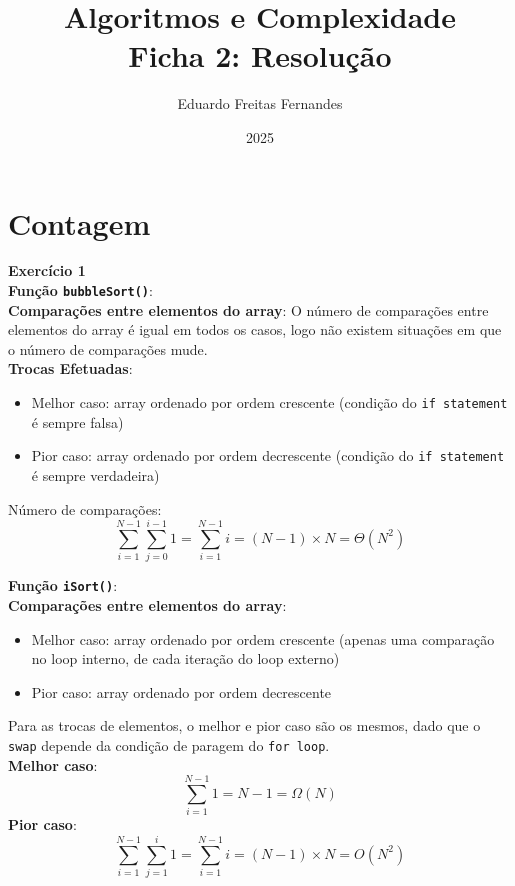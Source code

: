 \documentclass[a4paper,11pt]{article}
\title{Algoritmos e Complexidade\\ Ficha 2: Resolução}
\author{Eduardo Freitas Fernandes}
\date{2025}
\begin{document}
	
	\maketitle
	
	\section{Contagem}
	
	\textbf{Exercício 1}\\
	
	\noindent \textbf{Função \texttt{bubbleSort()}}:\\
	
	\noindent \textbf{Comparações entre elementos do array}:
	O número de comparações entre elementos do array é igual em todos os casos, logo não existem situações em que o número de comparações mude.\\
	
	\noindent \textbf{Trocas Efetuadas}:
	\begin{itemize}
		\item Melhor caso: array ordenado por ordem crescente (condição do \texttt{if statement} é sempre falsa)
		\item Pior caso: array ordenado por ordem decrescente (condição do \texttt{if statement} é sempre verdadeira)
	\end{itemize}
	
	\noindent Número de comparações:
	\[
	\sum_{i=1}^{N-1} \sum_{j=0}^{i-1} 1 = \sum_{i=1}^{N-1} i = (N-1) \times N = \Theta(N^2)
	\]
	
	\noindent \textbf{Função \texttt{iSort()}}:\\
	
	\noindent \textbf{Comparações entre elementos do array}:
	\begin{itemize}
		\item Melhor caso: array ordenado por ordem crescente (apenas uma comparação no loop interno, de cada iteração do loop externo)
		\item Pior caso: array ordenado por ordem decrescente
	\end{itemize}
	
	\noindent Para as trocas de elementos, o melhor e pior caso são os mesmos, dado que o \texttt{swap} depende da condição de paragem do \texttt{for loop}.\\
	
	\noindent \textbf{Melhor caso}:
	\[ \sum_{i=1}^{N-1} 1 = N-1 = \Omega(N) \]
	\textbf{Pior caso}:
	\[ \sum_{i=1}^{N-1} \sum_{j=1}^{i} 1 = \sum_{i=1}^{N-1} i = (N-1) \times N = O(N^2) \]
	
\end{document}
